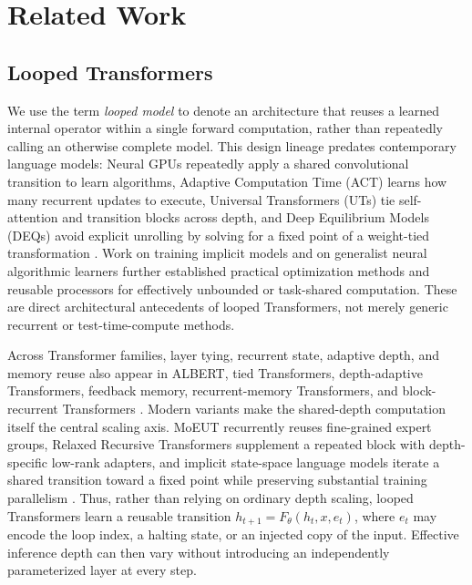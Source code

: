 \section{Related Work}
\label{sec:related_work}

\subsection{Looped Transformers}

We use the term \emph{looped model} to denote an architecture that reuses a learned internal operator within a single forward computation, rather than repeatedly calling an otherwise complete model. This design lineage predates contemporary language models: Neural GPUs repeatedly apply a shared convolutional transition to learn algorithms, Adaptive Computation Time (ACT) learns how many recurrent updates to execute, Universal Transformers (UTs) tie self-attention and transition blocks across depth, and Deep Equilibrium Models (DEQs) avoid explicit unrolling by solving for a fixed point of a weight-tied transformation \citep{kaiser2016neural,graves2016adaptive,dehghani2018universal,bai2019deep,bai2020multiscale}. Work on training implicit models and on generalist neural algorithmic learners further established practical optimization methods and reusable processors for effectively unbounded or task-shared computation. These are direct architectural antecedents of looped Transformers, not merely generic recurrent or test-time-compute methods.

Across Transformer families, layer tying, recurrent state, adaptive depth, and memory reuse also appear in ALBERT, tied Transformers, depth-adaptive Transformers, feedback memory, recurrent-memory Transformers, and block-recurrent Transformers \citep{lan2019albert,xia2019tied,elbayad2020depth,fan2020feedback,bulatov2022rmt,hutchins2022blockrecurrent}. Modern variants make the shared-depth computation itself the central scaling axis. MoEUT recurrently reuses fine-grained expert groups, Relaxed Recursive Transformers supplement a repeated block with depth-specific low-rank adapters, and implicit state-space language models iterate a shared transition toward a fixed point while preserving substantial training parallelism \citep{csordas2024moeut}. Thus, rather than relying on ordinary depth scaling, looped Transformers learn a reusable transition $h_{t+1}=F_{\theta}(h_t,x,e_t)$, where $e_t$ may encode the loop index, a halting state, or an injected copy of the input. Effective inference depth can then vary without introducing an independently parameterized layer at every step.

